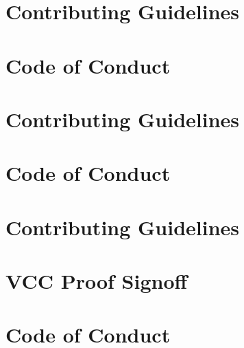 \documentclass[twoside]{book}
\newcommand{\+}{\discretionary{\mbox{\scriptsize$\hookleftarrow$}}{}{}}
\begin{document}
\chapter{Contributing Guidelines}
\label{md_crt_aws_crt_cpp_crt_aws_c_event_stream__c_o_n_t_r_i_b_u_t_i_n_g}

\chapter{Code of Conduct}
\label{md_crt_aws_crt_cpp_crt_aws_c_http__c_o_d_e__o_f__c_o_n_d_u_c_t}

\chapter{Contributing Guidelines}
\label{md_crt_aws_crt_cpp_crt_aws_c_http__c_o_n_t_r_i_b_u_t_i_n_g}

\chapter{Code of Conduct}
\label{md_crt_aws_crt_cpp_crt_aws_c_io__c_o_d_e__o_f__c_o_n_d_u_c_t}

\chapter{Contributing Guidelines}
\label{md_crt_aws_crt_cpp_crt_aws_c_io__c_o_n_t_r_i_b_u_t_i_n_g}

\chapter{VCC Proof Signoff}
\label{md_crt_aws_crt_cpp_crt_aws_c_io_docs_epoll_event_loop_proof}

\chapter{Code of Conduct}
\label{md_crt_aws_crt_cpp_crt_aws_c_mqtt__c_o_d_e__o_f__c_o_n_d_u_c_t}

\end{document}
